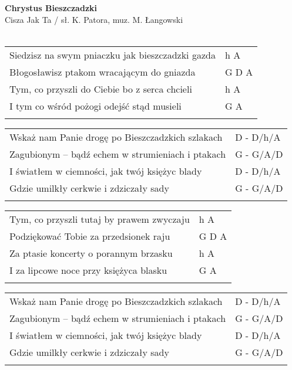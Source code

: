 \documentclass[a5paper]{article}
\begin{document}


\noindent
\fontsize{12pt}{15pt}\selectfont
\textbf{Chrystus Bieszczadzki} \\
\fontsize{8pt}{10pt}\selectfont
Cisza Jak Ta / sł. K. Patora, muz. M. Łangowski \\ \\
\fontsize{10pt}{12pt}\selectfont
{}
\begin{tabular}{@{}p{9.00cm}p{3cm}@{}}
\noindent
Siedzisz na swym pniaczku jak bieszczadzki gazda & h A \\
Błogosławisz ptakom wracającym do gniazda & G D A \\
Tym, co przyszli do Ciebie bo z serca chcieli & h A \\
I tym co wśród pożogi odejść stąd musieli & G A \\ \\
\end{tabular}

\noindent
\begin{tabular}{@{}p{8.00cm}p{3cm}@{}}
Wskaż nam Panie drogę po Bieszczadzkich szlakach & D - D/h/A \\
Zagubionym – bądź echem w strumieniach i ptakach & G - G/A/D \\
I światłem w ciemności, jak twój księżyc blady & D - D/h/A \\
Gdzie umilkły cerkwie i zdziczały sady & G - G/A/D \\ \\
\end{tabular}

\noindent
\begin{tabular}{@{}p{9.00cm}p{3cm}@{}}
Tym, co przyszli tutaj by prawem zwyczaju & h A \\
Podziękować  Tobie za przedsionek raju & G D A \\
Za ptasie koncerty o porannym brzasku & h A \\
I za lipcowe noce przy księżyca blasku & G A \\ \\
\end{tabular}

\noindent
\begin{tabular}{@{}p{8.00cm}p{3cm}@{}}
Wskaż nam Panie drogę po Bieszczadzkich szlakach & D - D/h/A \\
Zagubionym – bądź echem w strumieniach i ptakach & G - G/A/D \\
I światłem w ciemności, jak twój księżyc blady & D - D/h/A \\
Gdzie umilkły cerkwie i zdziczały sady & G - G/A/D \\ \\
\end{tabular}
\end{document}
